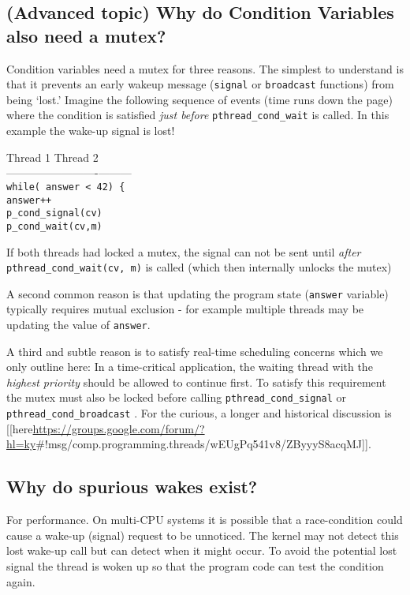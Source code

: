 \subsection{(Advanced topic) Why do Condition Variables also need a
mutex?}\label{advanced-topic-why-do-condition-variables-also-need-a-mutex}

Condition variables need a mutex for three reasons. The simplest to
understand is that it prevents an early wakeup message (\texttt{signal}
or \texttt{broadcast} functions) from being `lost.' Imagine the
following sequence of events (time runs down the page) where the
condition is satisfied \emph{just before }\texttt{pthread\_cond\_wait}
is called. In this example the wake-up signal is lost!

Thread 1 \textbar{} Thread
2\\-------------------------\textbar{}---------\\\texttt{while(\ answer\ \textless{}\ 42)\ \{}
\textbar{}\\ \textbar{} \texttt{answer++}\\ \textbar{}
\texttt{p\_cond\_signal(cv)}\\\texttt{p\_cond\_wait(cv,m)} \textbar{}

If both threads had locked a mutex, the signal can not be sent until
\emph{after} \texttt{pthread\_cond\_wait(cv,\ m)} is called (which then
internally unlocks the mutex)

A second common reason is that updating the program state
(\texttt{answer} variable) typically requires mutual exclusion - for
example multiple threads may be updating the value of \texttt{answer}.

A third and subtle reason is to satisfy real-time scheduling concerns
which we only outline here: In a time-critical application, the waiting
thread with the \emph{highest priority} should be allowed to continue
first. To satisfy this requirement the mutex must also be locked before
calling \texttt{pthread\_cond\_signal} or
\texttt{pthread\_cond\_broadcast} . For the curious, a longer and
historical discussion is
{[}{[}here\textbar{}\url{https://groups.google.com/forum/?hl=ky}\#!msg/comp.programming.threads/wEUgPq541v8/ZByyyS8acqMJ{]}{]}.

\subsection{Why do spurious wakes
exist?}\label{why-do-spurious-wakes-exist}

For performance. On multi-CPU systems it is possible that a
race-condition could cause a wake-up (signal) request to be unnoticed.
The kernel may not detect this lost wake-up call but can detect when it
might occur. To avoid the potential lost signal the thread is woken up
so that the program code can test the condition again.

